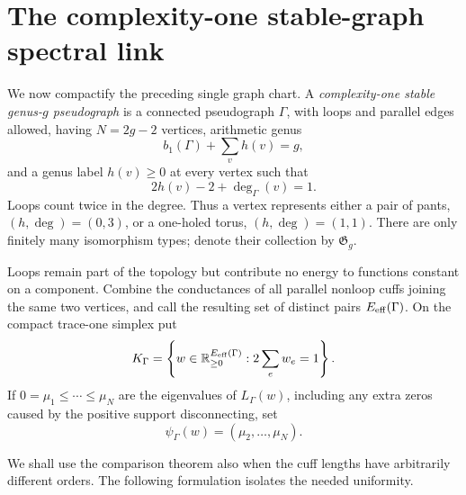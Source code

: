 \documentclass[11pt,reqno]{amsart}
\theoremstyle{definition}
\theoremstyle{remark}
\newcommand{\R}{\mathbb R}
\begin{document}
\section{The complexity-one stable-graph spectral link}
\label{sec:tangent-link}

We now compactify the preceding single graph chart.  A
\emph{complexity-one stable genus-$g$ pseudograph} is a connected
pseudograph $\Gamma$, with loops and parallel edges allowed, having
$N=2g-2$ vertices, arithmetic genus
\begin{equation}\label{eq:stable-arithmetic-genus}
 b_1(\Gamma)+\sum_v h(v)=g,
\end{equation}
and a genus label $h(v)\ge0$ at every vertex such that
\begin{equation}\label{eq:complexity-one-vertex}
 2h(v)-2+\deg_\Gamma(v)=1.
\end{equation}
Loops count twice in the degree.  Thus a vertex represents either a pair of
pants, $(h,\deg)=(0,3)$, or a one-holed torus, $(h,\deg)=(1,1)$.  There are
only finitely many isomorphism types; denote their collection by
$\mathfrak G_g$.

Loops remain part of the topology but contribute no energy to functions
constant on a component.  Combine the conductances of all parallel nonloop
cuffs joining the same two vertices, and call the resulting set of distinct
pairs $E_{\rm eff}(\Gamma)$.  On the compact trace-one simplex put
\[
 K_\Gamma=\left\{w\in\R_{\ge0}^{E_{\rm eff}(\Gamma)}:
                 2\sum_e w_e=1\right\}.
\]
If $0=\mu_1\le\cdots\le\mu_N$ are the eigenvalues of $L_\Gamma(w)$,
including any extra zeros caused by the positive support disconnecting, set
\[
 \psi_\Gamma(w)=(\mu_2,\ldots,\mu_N).
\]

We shall use the comparison theorem also when the cuff lengths have
arbitrarily different orders.  The following formulation isolates the
needed uniformity.
\end{document}
